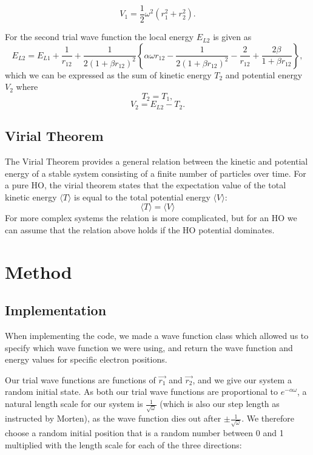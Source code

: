 \documentclass[norsk,a4paper,12pt]{article}
\begin{document}
\begin{equation}
V_1 = \frac{1}{2}\omega^2(r_1^2 + r_2^2).
\end{equation}

For the second trial wave function the local energy $E_{L2}$\cite{Project_text} is given as
\begin{equation}
E_{L2} = E_{L1} + \frac{1}{r_{12}} + \frac{1}{2(1+\beta r_{12})^2}\left\{\alpha\omega r_{12}-\frac{1}{2(1+\beta r_{12})^2}-\frac{2}{r_{12}}+\frac{2\beta}{1+\beta r_{12}}\right\},
\label{eq:EL2}
\end{equation}
which we can be expressed as the sum of kinetic energy $T_2$ and potential energy $V_2$ where
$$T_2 = T_1,$$
$$V_2 = E_{L2} - T_2.$$
\subsection{Virial Theorem}
The Virial Theorem provides a general relation between the kinetic and potential energy of a stable system consisting of a finite number of particles over time. For  a pure HO, the virial theorem states that the expectation value of the total kinetic energy $\langle T\rangle$ is equal to the total potential energy $\langle V\rangle$:
\begin{equation}
\langle T\rangle=\langle V\rangle
\label{eq:virial}
\end{equation}
For more complex systems the relation is more complicated, but for an HO we can assume that the relation above holds if the HO potential dominates.


\section{Method} \label{Method}


\subsection{Implementation}
When implementing the code, we made a wave function class which allowed us to specify which wave function we were using, and return the wave function and energy values for specific electron positions.
\par 
\vspace{2mm}

Our trial wave functions are functions of $\vec{r_1}$ and $\vec{r_2}$, and we give our system a random initial state. As both our trial wave functions are proportional to $e^{-\alpha \omega}$, a natural length scale for our system is $\frac{1}{\sqrt{\omega}}$ (which is also our step length as instructed by Morten), as the wave function dies out after $\pm \frac{1}{\sqrt{\omega}}$. We therefore choose a random initial position that is a random number between 0 and 1 multiplied with the length scale for each of the three directions:
\end{document}
